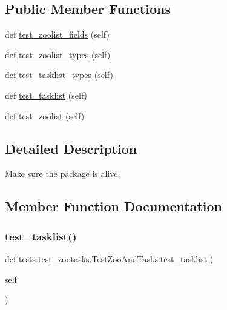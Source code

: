 \subsection*{Public Member Functions}
\begin{DoxyCompactItemize}
\item 
def \hyperlink{classtests_1_1test__zootasks_1_1TestZooAndTasks_a57e8f4db75b9eb31263d4e269c40068f}{test\+\_\+zoolist\+\_\+fields} (self)
\item 
def \hyperlink{classtests_1_1test__zootasks_1_1TestZooAndTasks_a8d7616fa41ed03322c86a565eedb4e8c}{test\+\_\+zoolist\+\_\+types} (self)
\item 
def \hyperlink{classtests_1_1test__zootasks_1_1TestZooAndTasks_ae25086584b24c10c24a9bda486b32c4a}{test\+\_\+tasklist\+\_\+types} (self)
\item 
def \hyperlink{classtests_1_1test__zootasks_1_1TestZooAndTasks_af33cbd4d8b989997428574cd787755ae}{test\+\_\+tasklist} (self)
\item 
def \hyperlink{classtests_1_1test__zootasks_1_1TestZooAndTasks_a1c1bb2568bc1871c11d14ac136a9e2b3}{test\+\_\+zoolist} (self)
\end{DoxyCompactItemize}


\subsection{Detailed Description}
\begin{DoxyVerb}Make sure the package is alive.
\end{DoxyVerb}
 

\subsection{Member Function Documentation}
\mbox{\label{classtests_1_1test__zootasks_1_1TestZooAndTasks_af33cbd4d8b989997428574cd787755ae}} 
\subsubsection{\texorpdfstring{test\+\_\+tasklist()}{test\_tasklist()}}
{\footnotesize\ttfamily def tests.\+test\+\_\+zootasks.\+Test\+Zoo\+And\+Tasks.\+test\+\_\+tasklist (\begin{DoxyParamCaption}\item[{}]{self }\end{DoxyParamCaption})}

